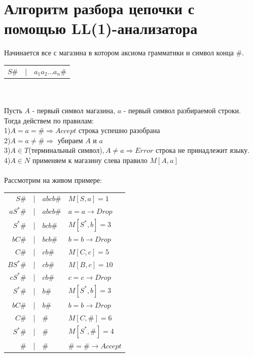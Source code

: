 \documentclass[14pt]{extreport}
\begin{document}
	\section{Алгоритм разбора цепочки с помощью LL(1)-анализатора}
	Начинается все с магазина в котором аксиома грамматики и символ конца $\#$.\\
	\begin{tabular}{rcl}
		$S\#$ & | & $a_1a_2...a_n\#$
	\end{tabular}\\\\
	Пусть $A$ - первый символ магазина, $a$ - первый символ разбираемой строки.\\
	Тогда действем по правилам:\\
	\hspace*{30pt}1)$A=a=\# \Rightarrow Accept$ строка успешно разобрана\\
	\hspace*{30pt}2)$A=a \neq \# \Rightarrow$ убираем $A$ и $a$\\
	\hspace*{30pt}3)$A \in T$(терминальный символ)$,A \neq a \Rightarrow Error$ строка не
	принадлежит языку.\\
	\hspace*{30pt}4)$A \in N$ применяем к магазину слева правило $M[A, a]$\\\\
	Рассмотрим на живом примере:\\
	\begin{tabular}{rcll}
		$S\#$ & | & $abcb\#$ & $M[S,a]=1$\\
		$aS^*\#$ & | & $abcb\#$ & $a=a \to Drop$\\
		$S^*\#$ & | & $bcb\#$ & $M[S^*,b]=3$\\
		$bC\#$ & | & $bcb\#$ & $b=b \to Drop$\\
		$C\#$ & | & $cb\#$ & $M[C, c]=5$\\
		$BS^*\#$ & | & $cb\#$ & $M[B, c]=10$\\
		$cS^*\#$ & | & $cb\#$ & $c=c \to Drop$\\
		$S^*\#$ & | & $b\#$ & $M[S^*,b]=3$\\
		$bC\#$ & | & $b\#$ & $b=b \to Drop$\\
		$C\#$ & | & $\#$ & $M[C, \#]=6$\\
		$S^*\#$ & | & $\#$ & $M[S^*, \#]=4$\\
		$\#$ & | & $\#$ & $\#=\# \to Accept$\\
	\end{tabular}\\\\
	
\end{document}
